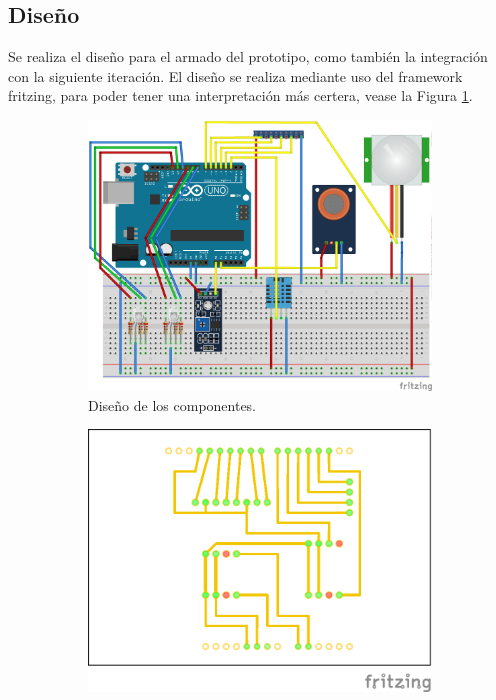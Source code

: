 \documentclass[11pt,letterpaper]{report}
\begin{document}
		\subsection{Diseño}
		Se realiza el diseño para el armado del prototipo, como también la integración con la siguiente iteración. El diseño se realiza mediante uso del framework fritzing, para poder tener una  interpretación más  certera, vease  la Figura \ref{fig:domotica_dis}.
			\begin{figure}[htp]
   			 \centering
    			\begin{subfigure}[b]{0.3\textwidth}
      			  \includegraphics[width=\textwidth]{imagenes/domotica_dis.png}
        		\caption{Diseño de los componentes. }
       			 \label{fig:domotica_dis}
   				 \end{subfigure}
   				 \qquad %
   				 \begin{subfigure}[b]{0.3\textwidth}
      			  \includegraphics[width=\textwidth]{imagenes/dis_PP.png}

\end{subfigure}
\end{figure}
\end{document}
